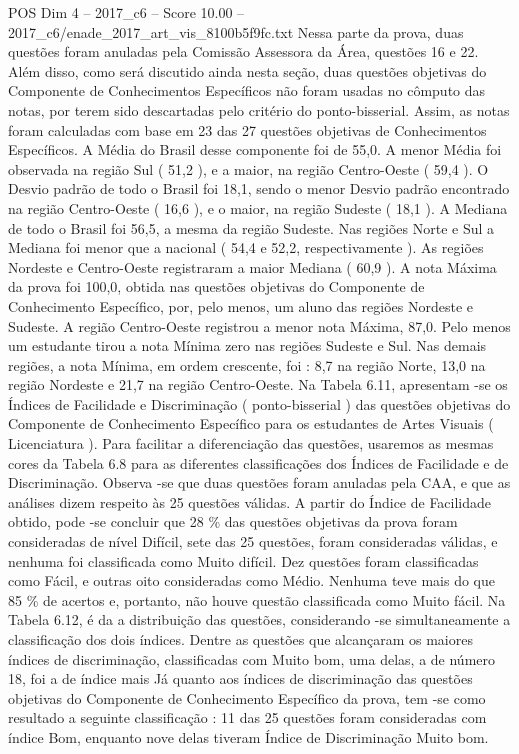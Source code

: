 \begin{textsample}{POS Dim 4 – 2017\_c6 – Score 10.00 – 2017\_c6/enade\_2017\_art\_vis\_8100b5f9fc.txt}
Nessa parte da prova, duas questões foram anuladas pela Comissão Assessora da Área, questões 16 e 22.
Além disso, como será discutido ainda nesta seção, duas questões objetivas do Componente de Conhecimentos Específicos não foram usadas no cômputo das notas, por terem sido descartadas pelo critério do ponto-bisserial.
Assim, as notas foram calculadas com base em 23 das 27 questões objetivas de Conhecimentos Específicos.
A Média do Brasil desse componente foi de 55,0.
A menor Média foi observada na região Sul ( 51,2 ), e a maior, na região Centro-Oeste ( 59,4 ).
O Desvio padrão de todo o Brasil foi 18,1, sendo o menor Desvio padrão encontrado na região Centro-Oeste ( 16,6 ), e o maior, na região Sudeste ( 18,1 ).
A Mediana de todo o Brasil foi 56,5, a mesma da região Sudeste.
Nas regiões Norte e Sul a Mediana foi menor que a nacional ( 54,4 e 52,2, respectivamente ).
As regiões Nordeste e Centro-Oeste registraram a maior Mediana ( 60,9 ).
A nota Máxima da prova foi 100,0, obtida nas questões objetivas do Componente de Conhecimento Específico, por, pelo menos, um aluno das regiões Nordeste e Sudeste.
A região Centro-Oeste registrou a menor nota Máxima, 87,0.
Pelo menos um estudante tirou a nota Mínima zero nas regiões Sudeste e Sul.
Nas demais regiões, a nota Mínima, em ordem crescente, foi : 8,7 na região Norte, 13,0 na região Nordeste e 21,7 na região Centro-Oeste.
Na Tabela 6.11, apresentam -se os Índices de Facilidade e Discriminação ( ponto-bisserial ) das questões objetivas do Componente de Conhecimento Específico para os estudantes de Artes Visuais ( Licenciatura ).
Para facilitar a diferenciação das questões, usaremos as mesmas cores da Tabela 6.8 para as diferentes classificações dos Índices de Facilidade e de Discriminação.
Observa -se que duas questões foram anuladas pela CAA, e que as análises dizem respeito às 25 questões válidas.
A partir do Índice de Facilidade obtido, pode -se concluir que 28 \% das questões objetivas da prova foram consideradas de nível Difícil, sete das 25 questões, foram consideradas válidas, e nenhuma foi classificada como Muito difícil.
Dez questões foram classificadas como Fácil, e outras oito consideradas como Médio.
Nenhuma teve mais do que 85 \% de acertos e, portanto, não houve questão classificada como Muito fácil.
Na Tabela 6.12, é da a distribuição das questões, considerando -se simultaneamente a classificação dos dois índices.
Dentre as questões que alcançaram os maiores índices de discriminação, classificadas com Muito bom, uma delas, a de número 18, foi a de índice mais Já quanto aos índices de discriminação das questões objetivas do Componente de Conhecimento Específico da prova, tem -se como resultado a seguinte classificação : 11 das 25 questões foram consideradas com índice Bom, enquanto nove delas tiveram Índice de Discriminação Muito bom.

\end{textsample}
